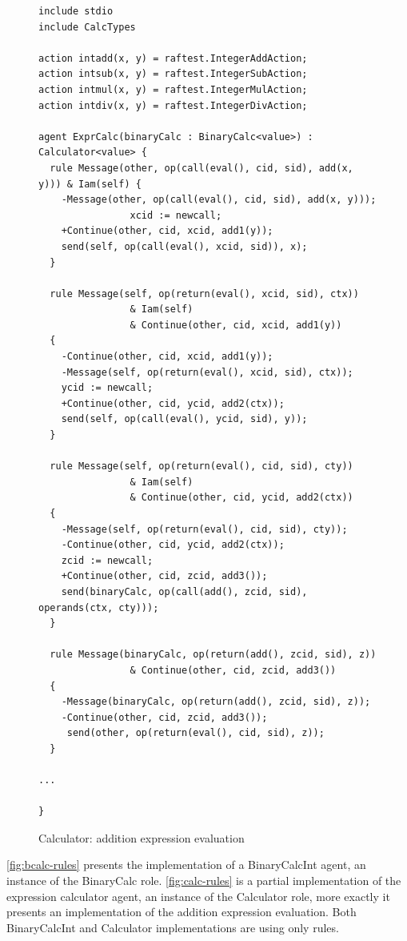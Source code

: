 \documentclass[a4paper,12pt,oneside,fleqn]{book} %
\begin{document}
{\begin{figure}\footnotesize %
\begin{verbatim}
include stdio
include CalcTypes

action intadd(x, y) = raftest.IntegerAddAction;
action intsub(x, y) = raftest.IntegerSubAction;
action intmul(x, y) = raftest.IntegerMulAction;
action intdiv(x, y) = raftest.IntegerDivAction;

agent ExprCalc(binaryCalc : BinaryCalc<value>) : Calculator<value> {
  rule Message(other, op(call(eval(), cid, sid), add(x, y))) & Iam(self) {
    -Message(other, op(call(eval(), cid, sid), add(x, y)));
                xcid := newcall;
    +Continue(other, cid, xcid, add1(y));
    send(self, op(call(eval(), xcid, sid)), x);
  }

  rule Message(self, op(return(eval(), xcid, sid), ctx))
                & Iam(self)
                & Continue(other, cid, xcid, add1(y))
  {
    -Continue(other, cid, xcid, add1(y));
    -Message(self, op(return(eval(), xcid, sid), ctx));
    ycid := newcall;
    +Continue(other, cid, ycid, add2(ctx));
    send(self, op(call(eval(), ycid, sid), y));
  }

  rule Message(self, op(return(eval(), cid, sid), cty))
                & Iam(self)
                & Continue(other, cid, ycid, add2(ctx))
  {
    -Message(self, op(return(eval(), cid, sid), cty));
    -Continue(other, cid, ycid, add2(ctx));
    zcid := newcall;
    +Continue(other, cid, zcid, add3());
    send(binaryCalc, op(call(add(), zcid, sid), operands(ctx, cty)));
  }

  rule Message(binaryCalc, op(return(add(), zcid, sid), z))
                & Continue(other, cid, zcid, add3())
  {
    -Message(binaryCalc, op(return(add(), zcid, sid), z));
    -Continue(other, cid, zcid, add3());
     send(other, op(return(eval(), cid, sid), z));
  }

...

}

\end{verbatim}
\caption{Calculator: addition expression evaluation}
\label{fig:calc-rules}
\end{figure} %

\autoref{fig:bcalc-rules} presents the implementation of a BinaryCalcInt
agent, an instance of the BinaryCalc role.  \autoref{fig:calc-rules} is
a partial implementation of the expression calculator agent, an instance of
the Calculator role, more exactly it presents an implementation of the
addition expression evaluation. Both BinaryCalcInt and Calculator
implementations are using only rules.

}
\end{document}
